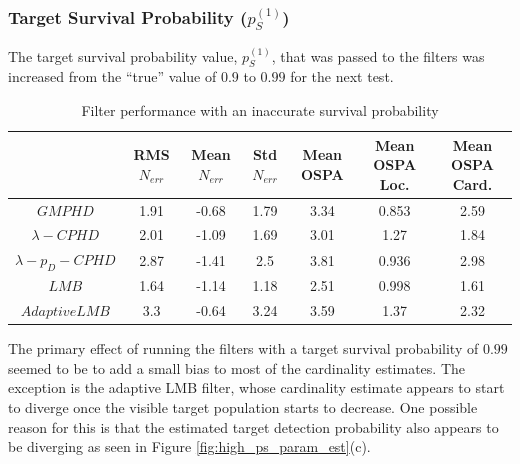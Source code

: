 \documentclass{article}
\newcommand{\tgt}{{(1)}}
\begin{document}
\subsubsection{Target Survival Probability ($p_S^{(1)}$)}
The target survival probability value, $p_S^\tgt$, that was passed to the filters was increased from the ``true'' value of $0.9$ to $0.99$ for the next test.
\begin{table}[H]
  \centering
\begin{tabular}{ c| c | c | c | c | c | c }
   & RMS $N_{err}$ & Mean $N_{err}$ & Std $N_{err}$ & Mean OSPA & Mean OSPA Loc. & Mean OSPA Card.\\
\hline
  $GMPHD$ & 1.91 & -0.68 & 1.79 & 3.34 & 0.853 & 2.59 \\
  $\lambda-CPHD$ & 2.01 & -1.09 & 1.69 & 3.01 & 1.27 & 1.84 \\
  $\lambda-p_D-CPHD$ & 2.87 & -1.41 & 2.5 & 3.81 & 0.936 & 2.98 \\
  $LMB$ & 1.64 & -1.14 & 1.18 & 2.51 & 0.998 & 1.61 \\
  $Adaptive LMB$ & 3.3 & -0.64 & 3.24 & 3.59 & 1.37 & 2.32 \\
\end{tabular}
  \caption{Filter performance with an inaccurate survival probability}
  \label{tab:high_ps}
\end{table}
The primary effect of running the filters with a target survival probability of $0.99$ seemed to be to add a small bias to most of the cardinality estimates. The exception is the adaptive LMB filter, whose cardinality estimate appears to start to diverge once the visible target population starts to decrease. One possible reason for this is that the estimated target detection probability also appears to be diverging as seen in Figure \ref{fig:high_ps_param_est}(c).
\end{document}
